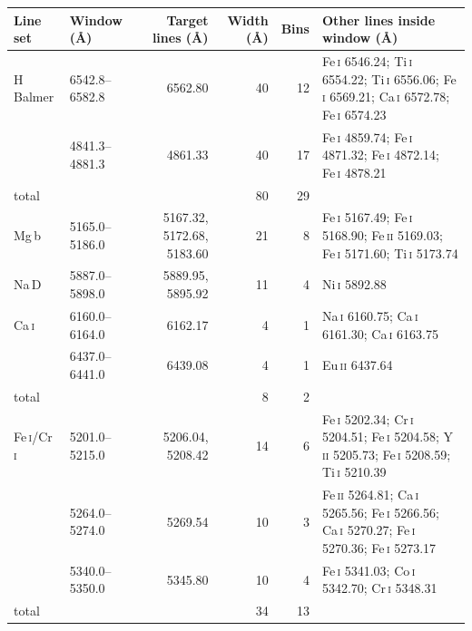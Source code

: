 \begin{tabular}{@{}llrrrp{5.2cm}@{}}
\toprule
Line set & Window (\AA) & Target lines (\AA) & Width (\AA) & Bins & Other lines inside window (\AA) \\
\midrule
H Balmer & 6542.8--6582.8 & 6562.80 & 40 & 12 & Fe\,\textsc{i} 6546.24; Ti\,\textsc{i} 6554.22; Ti\,\textsc{i} 6556.06; Fe\,\textsc{i} 6569.21; Ca\,\textsc{i} 6572.78; Fe\,\textsc{i} 6574.23 \\
 & 4841.3--4881.3 & 4861.33 & 40 & 17 & Fe\,\textsc{i} 4859.74; Fe\,\textsc{i} 4871.32; Fe\,\textsc{i} 4872.14; Fe\,\textsc{i} 4878.21 \\
\quad total & & & 80 & 29 & \\
\addlinespace
Mg\,b & 5165.0--5186.0 & 5167.32, 5172.68, 5183.60 & 21 & 8 & Fe\,\textsc{i} 5167.49; Fe\,\textsc{i} 5168.90; Fe\,\textsc{ii} 5169.03; Fe\,\textsc{i} 5171.60; Ti\,\textsc{i} 5173.74 \\
\addlinespace
Na\,D & 5887.0--5898.0 & 5889.95, 5895.92 & 11 & 4 & Ni\,\textsc{i} 5892.88 \\
\addlinespace
Ca\,\textsc{i} & 6160.0--6164.0 & 6162.17 & 4 & 1 & Na\,\textsc{i} 6160.75; Ca\,\textsc{i} 6161.30; Ca\,\textsc{i} 6163.75 \\
 & 6437.0--6441.0 & 6439.08 & 4 & 1 & Eu\,\textsc{ii} 6437.64 \\
\quad total & & & 8 & 2 & \\
\addlinespace
Fe\,\textsc{i}/Cr\,\textsc{i} & 5201.0--5215.0 & 5206.04, 5208.42 & 14 & 6 & Fe\,\textsc{i} 5202.34; Cr\,\textsc{i} 5204.51; Fe\,\textsc{i} 5204.58; Y\,\textsc{ii} 5205.73; Fe\,\textsc{i} 5208.59; Ti\,\textsc{i} 5210.39 \\
 & 5264.0--5274.0 & 5269.54 & 10 & 3 & Fe\,\textsc{ii} 5264.81; Ca\,\textsc{i} 5265.56; Fe\,\textsc{i} 5266.56; Ca\,\textsc{i} 5270.27; Fe\,\textsc{i} 5270.36; Fe\,\textsc{i} 5273.17 \\
 & 5340.0--5350.0 & 5345.80 & 10 & 4 & Fe\,\textsc{i} 5341.03; Co\,\textsc{i} 5342.70; Cr\,\textsc{i} 5348.31 \\
\quad total & & & 34 & 13 & \\
\bottomrule
\end{tabular}
